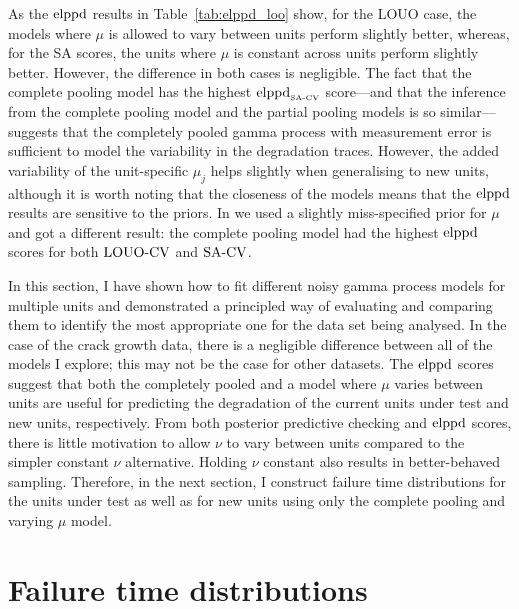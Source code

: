 As the $\hbox{elppd}$ results in Table~\ref{tab:elppd_loo} show, for the LOUO case, the models where $\mu$ is allowed to vary between units perform slightly better, whereas, for the SA scores, the units where $\mu$ is constant across units perform slightly better. However, the difference in both cases is negligible. The fact that the complete pooling model has the highest $\hbox{elppd}_{\hbox{\tiny{SA-CV}}}$ score---and that the inference from the complete pooling model and the partial pooling models is so similar---suggests that the completely pooled gamma process with measurement error is sufficient to model the variability in the degradation traces. However, the added variability of the unit-specific $\mu_j$ helps slightly when generalising to new units, although it is worth noting that the closeness of the models means that the $\hbox{elppd}$ results are sensitive to the priors. In \citet{leadbetter2024} we used a slightly miss-specified prior for $\mu$ and got a different result: the complete pooling model had the highest $\hbox{elppd}$ scores for both $\hbox{LOUO-CV}$ and $\hbox{SA-CV}$.

In this section, I have shown how to fit different noisy gamma process models for multiple units and demonstrated a principled way of evaluating and comparing them to identify the most appropriate one for the data set being analysed. In the case of the crack growth data, there is a negligible difference between all of the models I explore; this may not be the case for other datasets. The $\hbox{elppd}$ scores suggest that both the completely pooled and a model where $\mu$ varies between units are useful for predicting the degradation of the current units under test and new units, respectively. From both posterior predictive checking and $\hbox{elppd}$ scores, there is little motivation to allow $\nu$ to vary between units compared to the simpler constant $\nu$ alternative. Holding $\nu$ constant also results in better-behaved sampling. Therefore, in the next section, I construct failure time distributions for the units under test as well as for new units using only the complete pooling and varying $\mu$ model.

\section{Failure time distributions} \label{sec:unit-to-unit-ft}


